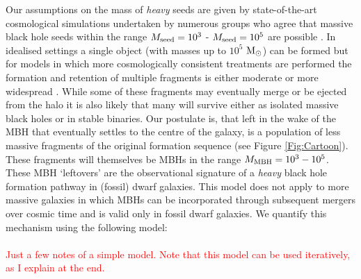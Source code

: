 \documentclass[twocolumn, tighten]{aastex631}
\newcommand{\msolarc} {$\rm{M_{\odot}}$}
\begin{document}
\indent Our assumptions on the mass of \textit{heavy} seeds are given by state-of-the-art cosmological simulations undertaken by numerous groups who agree that massive 
black hole seeds within the range $M_{\rm{seed}} = 10^3 $ - $M_{\rm{seed}} = 10^5$ are possible \citep{Hosokawa_2013, Latif_2013d, Regan_2014a, Inayoshi_2014, Inayoshi_2014b, Latif_2016a, Regan_2018a, Regan_2018b}. In idealised settings a single object (with masses up to $10^5$ \msolarc) can be formed \citep{Inayoshi_2014} but for models in which more cosmologically consistent treatments are performed the formation and retention of multiple fragments is either moderate \citep[e.g.][]{Regan_2018a, Regan_2018b} or more widespread \citep{Wise_2019, Regan_2020b}. While some of these fragments may eventually merge or be ejected from the 
halo it is also likely that many will survive either as isolated massive black holes or in stable binaries. Our postulate is, that left in the wake of the MBH that eventually settles to 
the centre of the galaxy, is a population of less massive fragments of the original formation sequence (see Figure \ref{Fig:Cartoon}). These fragments will themselves be MBHs in the range $M_{\rm{MBH}} = 10^3 - 10^5$. These MBH `leftovers' are the observational
signature of a \textit{heavy} black hole formation pathway in (fossil) dwarf galaxies. This model does not apply to 
more massive galaxies in which MBHs can be incorporated through subsequent mergers over cosmic time and is valid only in fossil dwarf galaxies. 
We quantify this mechanism using the following model:\\ \\


\textcolor{red}{Just a few notes of a simple model. Note that this model can be used iteratively, as I explain at the end.}
\end{document}

